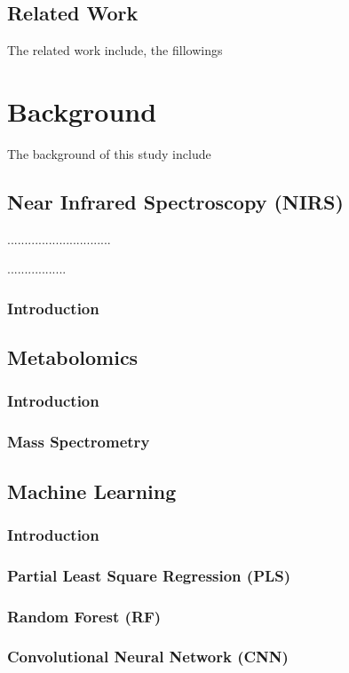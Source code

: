 \documentclass[12pt,a4paper]{report}
\begin{document}
\section{Related Work}
The related work include, the fillowings

\chapter{Background}
The background of this study include
\section{Near Infrared Spectroscopy (NIRS)}
..............................\par
.................
\subsection{Introduction}
\section{Metabolomics}
\subsection{Introduction}
\subsection{Mass Spectrometry}


\section{Machine Learning}
\subsection{Introduction}
\subsection{Partial Least Square Regression (PLS)}
\subsection{Random Forest (RF)}
\subsection{Convolutional Neural Network (CNN)}
\end{document}

